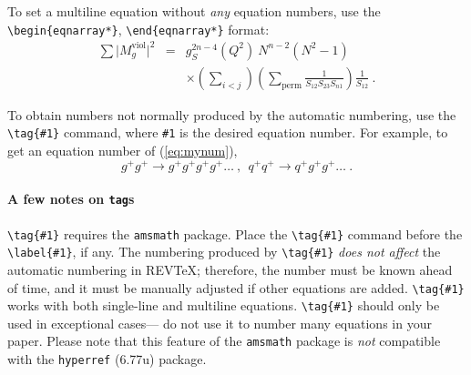 \documentclass[%
 reprint,
 amsmath,amssymb,
 aps,
]{revtex4-2}
\begin{document}
To set a multiline equation without \emph{any} equation
numbers, use the \verb+\begin{eqnarray*}+,
\verb+\end{eqnarray*}+ format:
\begin{eqnarray*}
\sum \vert M^{\text{viol}}_g \vert ^2&=&g^{2n-4}_S(Q^2)~N^{n-2}
        (N^2-1)\\
 & &\times \left( \sum_{i<j}\right)
 \left(
  \sum_{\text{perm}}\frac{1}{S_{12}S_{23}S_{n1}}
 \right)
 \frac{1}{S_{12}}~.
\end{eqnarray*}

To obtain numbers not normally produced by the automatic numbering,
use the \verb+\tag{#1}+ command, where \verb+#1+ is the desired
equation number. For example, to get an equation number of
(\ref{eq:mynum}),
\begin{equation}
g^+g^+ \rightarrow g^+g^+g^+g^+ \dots ~,~~q^+q^+\rightarrow
q^+g^+g^+ \dots ~. \tag{2.6$'$}\label{eq:mynum}
\end{equation}

\paragraph{A few notes on \texttt{tag}s} 
\verb+\tag{#1}+ requires the \texttt{amsmath} package. 
Place the \verb+\tag{#1}+ command before the \verb+\label{#1}+, if any. 
The numbering produced by \verb+\tag{#1}+ \textit{does not affect} 
the automatic numbering in REV\TeX; 
therefore, the number must be known ahead of time, 
and it must be manually adjusted if other equations are added. 
\verb+\tag{#1}+ works with both single-line and multiline equations. 
\verb+\tag{#1}+ should only be used in exceptional cases---%
do not use it to number many equations in your paper. 
Please note that this feature of the \texttt{amsmath} package
is \emph{not} compatible with the \texttt{hyperref} (6.77u) package.
\end{document}
